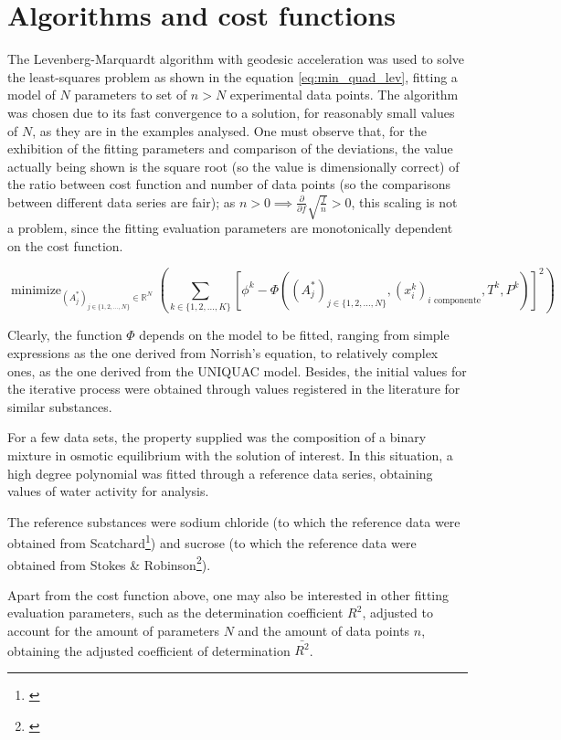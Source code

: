 \documentclass[
	12pt,				%
	openright,
	twoside,
	a4paper,			%
	brazil,			%
	french,				%
	english				%
	]{abntex2}
\DeclareMathOperator*{\minimize}{minimize}
\begin{document}
\chapter{Algorithms and cost functions}

The Levenberg-Marquardt algorithm with geodesic acceleration was used to solve
the least-squares problem as shown in the equation \ref{eq:min_quad_lev},
fitting a model of $N$ parameters to set of $n>N$ experimental data points.
The algorithm was chosen due to its fast convergence to a solution, for reasonably
small values of $N$, as they are in the examples analysed.
One must observe that, for the exhibition of the fitting parameters and comparison
of the deviations, the value actually being shown is the square root (so the value
is dimensionally correct) of the ratio between cost function and number of
data points (so the comparisons between different data series are fair); as $n>0 %
\implies \frac{\partial}{\partial f}\sqrt{\frac{f}{n}} >0$, this scaling is not a
problem, since the fitting evaluation parameters are monotonically dependent on
the cost function.

\begin{equation}
	\label{eq:min_quad_lev}
	\minimize_{(A_j^*)_{j \in \{1,2,\ldots,N\}} \in \mathbb{R}^N}%
	\left(\sum_{k \in \{1,2,\ldots,K\}}\left[\phi^k - \Phi((A^*_j)_{j%
	\in \{1, 2, \ldots, N\}}, (x^k_i)_\text{$i$ componente},%
	T^k, P^k)\right]^2\right)
\end{equation}

Clearly, the function $\Phi$ depends on the model to be fitted, ranging from simple
expressions as the one derived from Norrish's equation, to relatively complex
ones, as the one derived from the UNIQUAC model. Besides, the initial values for
the iterative process were obtained through values registered in the literature for
similar substances.

For a few data sets, the property supplied was the composition of a binary mixture
in osmotic equilibrium with the solution of interest. In this situation, a high
degree polynomial was fitted through a reference data series, obtaining values of
water activity for analysis.

The reference substances were sodium chloride (to which the reference data were
obtained from Scatchard\footnote{\cite{scatchard1938}}) and sucrose (to which
the reference data were obtained from Stokes \& Robinson\footnote{\cite{%
stokes1961}}).

Apart from the cost function above, one may also be interested in other fitting
evaluation parameters, such as the determination coefficient $R^2$, adjusted
to account for the amount of parameters $N$ and the amount of data points $n$,
obtaining the adjusted coefficient of determination $\bar{R^2}$.
\end{document}
